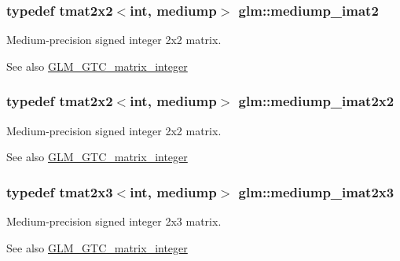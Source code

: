 \subsubsection[{mediump\+\_\+imat2}]{\setlength{\rightskip}{0pt plus 5cm}typedef tmat2x2$<$int, mediump$>$ {\bf glm\+::mediump\+\_\+imat2}}\label{group__gtc__matrix__integer_gae812330b83568359273b6ec96b002863}
Medium-\/precision signed integer 2x2 matrix. \begin{DoxySeeAlso}{See also}
\hyperlink{group__gtc__matrix__integer}{G\+L\+M\+\_\+\+G\+T\+C\+\_\+matrix\+\_\+integer} 
\end{DoxySeeAlso}
\hypertarget{group__gtc__matrix__integer_ga52a40f2f95562746fd8084726a300963}{}
\subsubsection[{mediump\+\_\+imat2x2}]{\setlength{\rightskip}{0pt plus 5cm}typedef tmat2x2$<$int, mediump$>$ {\bf glm\+::mediump\+\_\+imat2x2}}\label{group__gtc__matrix__integer_ga52a40f2f95562746fd8084726a300963}
Medium-\/precision signed integer 2x2 matrix. \begin{DoxySeeAlso}{See also}
\hyperlink{group__gtc__matrix__integer}{G\+L\+M\+\_\+\+G\+T\+C\+\_\+matrix\+\_\+integer} 
\end{DoxySeeAlso}
\hypertarget{group__gtc__matrix__integer_ga07314e9f05b82367570ca44c3ef7c0a7}{}
\subsubsection[{mediump\+\_\+imat2x3}]{\setlength{\rightskip}{0pt plus 5cm}typedef tmat2x3$<$int, mediump$>$ {\bf glm\+::mediump\+\_\+imat2x3}}\label{group__gtc__matrix__integer_ga07314e9f05b82367570ca44c3ef7c0a7}
Medium-\/precision signed integer 2x3 matrix. \begin{DoxySeeAlso}{See also}
\hyperlink{group__gtc__matrix__integer}{G\+L\+M\+\_\+\+G\+T\+C\+\_\+matrix\+\_\+integer} 
\end{DoxySeeAlso}
\hypertarget{group__gtc__matrix__integer_ga944a139f15de6bc12e9c7bf615ffc4f5}{}
